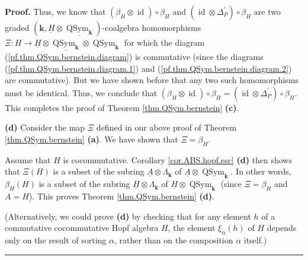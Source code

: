 \documentclass
[numbers=enddot,12pt,final,onecolumn,notitlepage,abstracton]{scrartcl}%
\theoremstyle{definition}
\newenvironment{proof}[1][Proof]{\noindent\textbf{#1.} }{\ \rule{0.5em}{0.5em}}
\begin{document}
\begin{proof}
Thus, we know that $\left(  \beta_{H}\otimes\operatorname*{id}\right)
\circ\beta_{H}$ and $\left(  \operatorname*{id}\otimes\Delta_{P}^{\prime
}\right)  \circ\beta_{H}$ are two graded $\left(  \mathbf{k},\underline{H}%
\otimes\underline{\operatorname*{QSym}\nolimits_{\mathbf{k}}}\right)
$-coalgebra homomorphisms $\Xi:H\rightarrow\underline{H}\otimes
\underline{\operatorname*{QSym}\nolimits_{\mathbf{k}}}\otimes
\operatorname*{QSym}\nolimits_{\mathbf{k}}$ for which the diagram
(\ref{pf.thm.QSym.bernstein.diagram}) is commutative (since the diagrams
(\ref{pf.thm.QSym.bernstein.diagram.1}) and
(\ref{pf.thm.QSym.bernstein.diagram.2}) are commutative). But we have shown
before that any two such homomorphisms must be identical. Thus, we conclude
that $\left(  \beta_{H}\otimes\operatorname*{id}\right)  \circ\beta
_{H}=\left(  \operatorname*{id}\otimes\Delta_{P}^{\prime}\right)  \circ
\beta_{H}$. This completes the proof of Theorem \ref{thm.QSym.bernstein}
\textbf{(c)}.

\textbf{(d)} Consider the map $\Xi$ defined in our above proof of Theorem
\ref{thm.QSym.bernstein} \textbf{(a)}. We have shown that $\Xi=\beta_{H}$.

Assume that $H$ is cocommutative. Corollary \ref{cor.ABS.hopf.esc}
\textbf{(d)} then shows that $\Xi\left(  H\right)  $ is a subset of the
subring $\underline{A}\otimes\Lambda_{\mathbf{k}}$ of $\underline{A}%
\otimes\operatorname*{QSym}\nolimits_{\mathbf{k}}$. In other words, $\beta
_{H}\left(  H\right)  $ is a subset of the subring $\underline{H}%
\otimes\Lambda_{\mathbf{k}}$ of $\underline{H}\otimes\operatorname*{QSym}%
\nolimits_{\mathbf{k}}$ (since $\Xi=\beta_{H}$ and $A=H$). This proves Theorem
\ref{thm.QSym.bernstein} \textbf{(d)}.

(Alternatively, we could prove \textbf{(d)} by checking that for any element
$h$ of a commutative cocommutative Hopf algebra $H$, the element $\xi_{\alpha
}\left(  h\right)  $ of $H$ depends only on the result of sorting $\alpha$,
rather than on the composition $\alpha$ itself.)
\end{proof}
\end{document}
